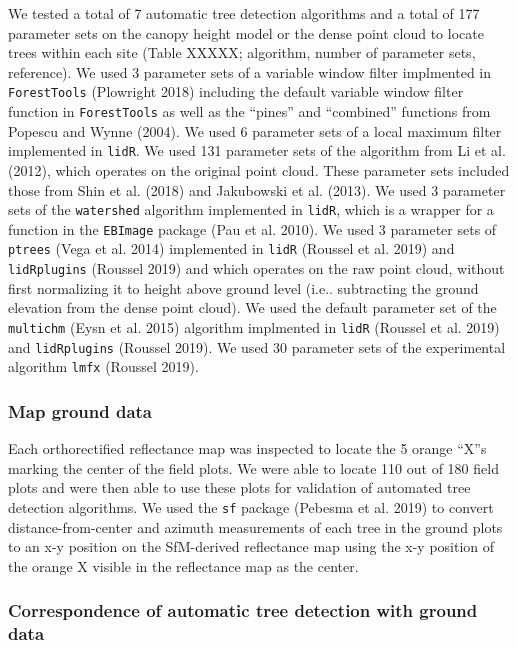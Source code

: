 \documentclass[]{article}
\begin{document}
We tested a total of 7 automatic tree detection algorithms and a total
of 177 parameter sets on the canopy height model or the dense point
cloud to locate trees within each site (Table XXXXX; algorithm, number
of parameter sets, reference). We used 3 parameter sets of a variable
window filter implmented in \texttt{ForestTools} (Plowright 2018)
including the default variable window filter function in
\texttt{ForestTools} as well as the ``pines'' and ``combined'' functions
from Popescu and Wynne (2004). We used 6 parameter sets of a local
maximum filter implemented in \texttt{lidR}. We used 131 parameter sets
of the algorithm from Li et al. (2012), which operates on the original
point cloud. These parameter sets included those from Shin et al. (2018)
and Jakubowski et al. (2013). We used 3 parameter sets of the
\texttt{watershed} algorithm implemented in \texttt{lidR}, which is a
wrapper for a function in the \texttt{EBImage} package (Pau et al.
2010). We used 3 parameter sets of \texttt{ptrees} (Vega et al. 2014)
implemented in \texttt{lidR} (Roussel et al. 2019) and
\texttt{lidRplugins} (Roussel 2019) and which operates on the raw point
cloud, without first normalizing it to height above ground level (i.e..
subtracting the ground elevation from the dense point cloud). We used
the default parameter set of the \texttt{multichm} (Eysn et al. 2015)
algorithm implmented in \texttt{lidR} (Roussel et al. 2019) and
\texttt{lidRplugins} (Roussel 2019). We used 30 parameter sets of the
experimental algorithm \texttt{lmfx} (Roussel 2019).

\subsubsection{Map ground data}\label{map-ground-data}

Each orthorectified reflectance map was inspected to locate the 5 orange
``X''s marking the center of the field plots. We were able to locate 110
out of 180 field plots and were then able to use these plots for
validation of automated tree detection algorithms. We used the
\texttt{sf} package (Pebesma et al. 2019) to convert
distance-from-center and azimuth measurements of each tree in the ground
plots to an x-y position on the SfM-derived reflectance map using the
x-y position of the orange X visible in the reflectance map as the
center.

\subsubsection{Correspondence of automatic tree detection with ground
data}\label{correspondence-of-automatic-tree-detection-with-ground-data}
\end{document}
